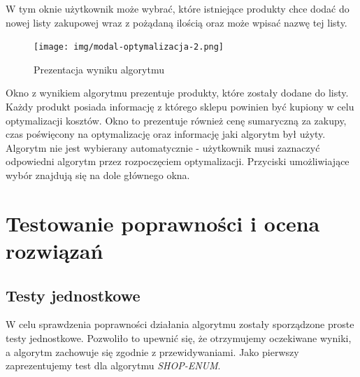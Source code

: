 \documentclass[a4paper]{article}
\let\oldsection\section
\renewcommand\section{\clearpage\oldsection}
\begin{document}
\begin{flushleft}
W tym oknie użytkownik może wybrać, które istniejące produkty chce dodać do nowej listy zakupowej wraz z pożądaną ilością oraz może wpisać nazwę tej listy.
\end{flushleft}
\begin{figure}[H]
\centering
\texttt{[image: img/modal-optymalizacja-2.png]}
\caption{Prezentacja wyniku algorytmu}
\end{figure}
\begin{flushleft}
Okno z wynikiem algorytmu prezentuje produkty, które zostały dodane do listy. Każdy produkt posiada informację z którego sklepu powinien być kupiony w celu optymalizacji kosztów. Okno to prezentuje również cenę sumaryczną za zakupy, czas poświęcony na optymalizację oraz informację jaki algorytm był użyty. Algorytm nie jest wybierany automatycznie - użytkownik musi zaznaczyć odpowiedni algorytm przez rozpoczęciem optymalizacji. Przyciski umożliwiające wybór znajdują się na dole głównego okna.
\end{flushleft}
\section{Testowanie poprawności i ocena rozwiązań}
\subsection{Testy jednostkowe}
W celu sprawdzenia poprawności działania algorytmu zostały sporządzone proste testy jednostkowe. Pozwoliło to upewnić się, że otrzymujemy oczekiwane wyniki, a algorytm zachowuje się zgodnie z przewidywaniami. Jako pierwszy zaprezentujemy test dla algorytmu \textit{SHOP-ENUM}.
\end{document}
